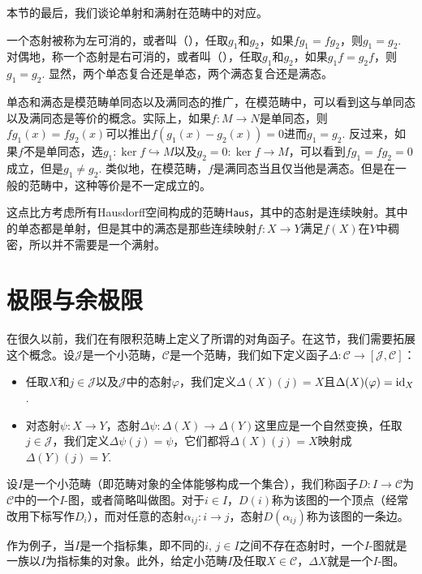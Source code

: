 本节的最后，我们谈论单射和满射在范畴中的对应。

\begin{para}
一个态射被称为左可消的，或者叫（），任取$g_1$和$g_2$，如果$fg_1=fg_2$，则$g_1=g_2$. 对偶地，称一个态射是右可消的，或者叫（），任取$g_1$和$g_2$，如果$g_1f=g_2f$，则$g_1=g_2$. 显然，两个单态复合还是单态，两个满态复合还是满态。
\end{para}

单态和满态是模范畴单同态以及满同态的推广，在模范畴中，可以看到这与单同态以及满同态是等价的概念。实际上，如果$f:M\to N$是单同态，则$fg_1(x)=fg_2(x)$可以推出$f(g_1(x)-g_2(x))=0$进而$g_1=g_2$. 反过来，如果$f$不是单同态，选$g_1:\ker f\hookrightarrow M$以及$g_2=0:\ker f\to M$，可以看到$fg_1=fg_2=0$成立，但是$g_1\neq g_2$. 类似地，在模范畴，$f$是满同态当且仅当他是满态。但是在一般的范畴中，这种等价是不一定成立的。

这点比方考虑所有Hausdorff空间构成的范畴$\mathsf{Haus}$，其中的态射是连续映射。其中的单态都是单射，但是其中的满态是那些连续映射$f:X\to Y$满足$f(X)$在$Y$中稠密，所以并不需要是一个满射。

\section{极限与余极限}

\para 在很久以前，我们在有限积范畴上定义了所谓的对角函子。在这节，我们需要拓展这个概念。设$\mathcal{J}$是一个小范畴，$\mathcal{C}$是一个范畴，我们如下定义函子$\Delta:\mathcal{C}\to [\mathcal{J},\mathcal{C}]$：
\begin{itemize}
\item 任取$X$和$j\in \mathcal{J}$以及$\mathcal{J}$中的态射$\varphi$，我们定义$\Delta(X)(j)=X$且$\Delta(X)(\varphi)=\operatorname{id}_X$.
\item 对态射$\psi:X\to Y$，态射$\Delta\psi:\Delta(X)\to \Delta(Y)$这里应是一个自然变换，任取$j\in \mathcal{J}$，我们定义$\Delta\psi(j)=\psi$，它们都将$\Delta(X)(j)=X$映射成$\Delta(Y)(j)=Y$.
\end{itemize}

\para 设$I$是一个小范畴（即范畴对象的全体能够构成一个集合），我们称函子$D:I\to \mathcal{C}$为$\mathcal{C}$中的一个$I$-图，或者简略叫做图。对于$i\in I$，$D(i)$称为该图的一个顶点（经常改用下标写作$D_i$），而对任意的态射$\alpha_{ij}:i\to j$，态射$D(\alpha_{ij})$称为该图的一条边。

作为例子，当$I$是一个指标集，即不同的$i$, $j\in I$之间不存在态射时，一个$I$-图就是一族以$I$为指标集的对象。此外，给定小范畴$I$及任取$X\in \mathcal{C}$，$\Delta X$就是一个$I$-图。

